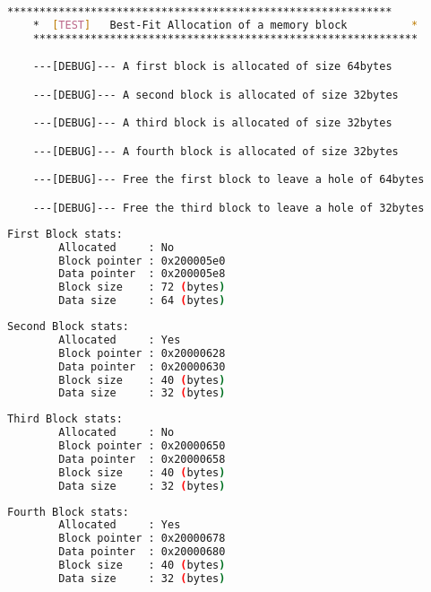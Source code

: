     \begin{outputbox}
    \begin{lstlisting}[language=bash]
    ************************************************************
    *  [TEST]   Best-Fit Allocation of a memory block          *
    ************************************************************

    ---[DEBUG]--- A first block is allocated of size 64bytes

    ---[DEBUG]--- A second block is allocated of size 32bytes

    ---[DEBUG]--- A third block is allocated of size 32bytes

    ---[DEBUG]--- A fourth block is allocated of size 32bytes

    ---[DEBUG]--- Free the first block to leave a hole of 64bytes

    ---[DEBUG]--- Free the third block to leave a hole of 32bytes
    \end{lstlisting}
    \end{outputbox}

    \begin{outputbox}
    \begin{lstlisting}[language=bash]
    First Block stats:
        Allocated     : No
        Block pointer : 0x200005e0
        Data pointer  : 0x200005e8
        Block size    : 72 (bytes)
        Data size     : 64 (bytes)
    \end{lstlisting}
    \end{outputbox}

    \begin{outputbox}
    \begin{lstlisting}[language=bash]
    Second Block stats:
        Allocated     : Yes
        Block pointer : 0x20000628
        Data pointer  : 0x20000630
        Block size    : 40 (bytes)
        Data size     : 32 (bytes)
    \end{lstlisting}
    \end{outputbox}

    \begin{outputbox}
    \begin{lstlisting}[language=bash]
    Third Block stats:
        Allocated     : No
        Block pointer : 0x20000650
        Data pointer  : 0x20000658
        Block size    : 40 (bytes)
        Data size     : 32 (bytes)
    \end{lstlisting}
    \end{outputbox}

    \begin{outputbox}
    \begin{lstlisting}[language=bash]
    Fourth Block stats:
        Allocated     : Yes
        Block pointer : 0x20000678
        Data pointer  : 0x20000680
        Block size    : 40 (bytes)
        Data size     : 32 (bytes)
    \end{lstlisting}
    \end{outputbox}

